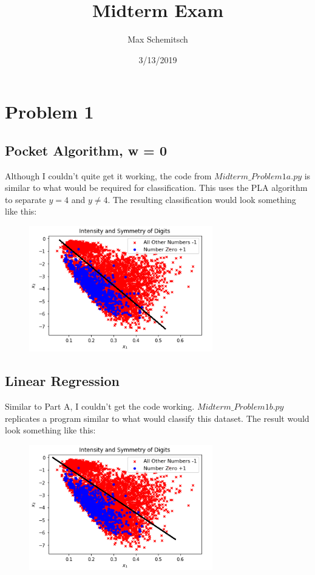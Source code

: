 \documentclass[a4paper]{article}
\title{Midterm Exam}
\author{Max Schemitsch}
\date{3/13/2019}
\begin{document}
\lstset{language=Python}

\maketitle

\section{Problem 1}
\subsection{Pocket Algorithm, w = 0}
Although I couldn't quite get it working, the code from $Midterm\_Problem1a.py$ is similar to what would be required for classification. This uses the PLA algorithm to separate $y=4$ and $y \neq 4$. The resulting classification would look something like this:

\begin{figure}[h]
  \begin{center}
    \includegraphics[width=80mm,scale=0.8]{typeA.png}
  \end{center}
\end{figure}

\subsection{Linear Regression}
Similar to Part A, I couldn't get the code working. $Midterm\_Problem1b.py$ replicates a program similar to what would classify this dataset. The result would look something like this:

\begin{figure}[h]
  \begin{center}
    \includegraphics[width=80mm,scale=0.8]{typeB.png}
  \end{center}
\end{figure}
\end{document}
